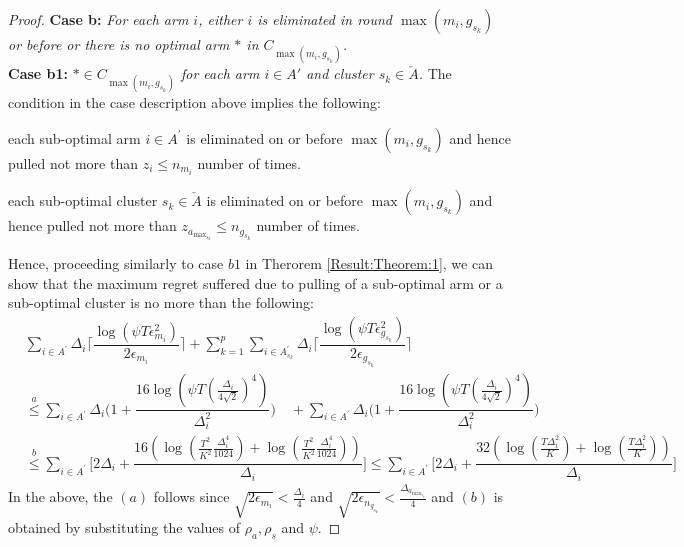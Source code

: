 \begin{proof}
\textbf{Case b:} \textit{For each arm $i$, either ${i}$ is eliminated in round $\max (m_{i},g_{s_{k}})$ or before or there is no optimal arm ${*}$ in $C_{\max(m_{i},g_{s_{k}})}$.} \\
\textbf{Case b1:} \textit{${*}\in C_{\max(m_{i},g_{s_{k}})}$ for each arm $i \in A'$ and cluster $s_k \in \check A$.} 
The condition in the case description above implies the following: \\
\begin{inparaenum}[\bfseries (i)]
\item each sub-optimal arm ${i}\in A^{'}$ is  eliminated on or before $\max (m_{i},g_{s_{k}})$ and hence  pulled not more than $z_i \leq n_{m_{i}}$ number of times.\\
\item each sub-optimal cluster $s_k \in \check A$ is  eliminated on or before $\max (m_{i},g_{s_{k}})$ and hence  pulled not more than $ z_{a_{\max_{s_{k}}}} \leq n_{g_{s_{k}}}$ number of times.
\end{inparaenum}

Hence, proceeding similarly to case $b1$ in Therorem \ref{Result:Theorem:1}, we can show that the maximum regret suffered due to pulling of a sub-optimal arm or a sub-optimal cluster is no more than the following:
 \begin{align*}
 &\sum_{i\in A^{'}}\Delta_{i}\bigg\lceil\dfrac{\log{(\psi T\epsilon_{m_{i}}^{2})}}{2\epsilon_{m_{i}}}\bigg\rceil 
\!+\! \sum_{k=1}^{p}\sum_{i\in A_{s_{k}}^{'}}\Delta_{i}\bigg\lceil\dfrac{\log{(\psi T\epsilon_{g_{s_{k}}}^{2})}}{2\epsilon_{g_{s_{k}}}}\bigg\rceil \\
&\overset{a}{\leq}\sum_{i\in A^{'}}\Delta_{i}\bigg(1+\dfrac{16\log{\left(\psi T\left(\frac{\Delta_{i}}{4\sqrt{2}}\right)^{4}\right)}}{\Delta_{i}^{2}}\bigg) 
\quad+ \sum_{i\in A^{'}}\Delta_{i}\bigg(1+\dfrac{16\log{\left(\psi T\left(\frac{\Delta_{i}}{4\sqrt{2}}\right)^{4}\right)}}{\Delta_{i}^{2}}\bigg)
\\
 &\overset{b}{\leq} \sum_{i\in A^{'}}\!\bigg[ 2\Delta_{i}+\dfrac{16(\log{(\frac{T^2}{K^2}\frac{\Delta_{i}^{4}}{1024})} + \log{(\frac{T^2}{K^2}\frac{\Delta_{i}^{4}}{1024})})}{\Delta_{i}} \bigg] \leq \sum_{i\in A^{'}}\!\bigg[ 2\Delta_{i}+\dfrac{32\left(\log{(\frac{T\Delta_{i}^2}{K})} + \log{(\frac{T\Delta_{i}^2}{K})}\right)}{\Delta_{i}} \bigg]
 \end{align*}
In the above, the $(a)$ follows since $\sqrt{2\epsilon_{m_{i}}} < \frac{\Delta_{i}}{4}$ and $\sqrt{2\epsilon_{n_{g_{s_{k}}}}} < \frac{\Delta_{a_{\max_{s_{k}}}}}{4}$ and $(b)$ is obtained by substituting the values of $\rho_a,\rho_s$ and $\psi$.


\end{proof}
